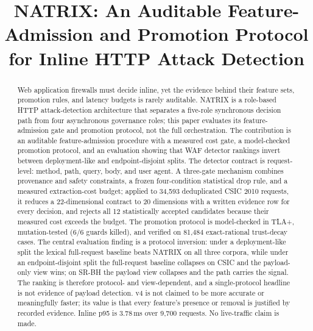 \documentclass[conference]{IEEEtran}
\begin{document}
\title{NATRIX: An Auditable Feature-Admission and Promotion Protocol for Inline HTTP Attack Detection}

\author{
\and
{}
}

\maketitle

\begin{abstract}
Web application firewalls must decide inline, yet the evidence behind their feature sets, promotion rules, and latency budgets is rarely auditable. NATRIX is a role-based HTTP attack-detection architecture that separates a five-role synchronous decision path from four asynchronous governance roles; this paper evaluates its feature-admission gate and promotion protocol, not the full orchestration. The contribution is an auditable feature-admission procedure with a measured cost gate, a model-checked promotion protocol, and an evaluation showing that WAF detector rankings invert between deployment-like and endpoint-disjoint splits. The detector contract is request-level: method, path, query, body, and user agent. A three-gate mechanism combines provenance and safety constraints, a frozen four-condition statistical drop rule, and a measured extraction-cost budget; applied to 34,593 deduplicated CSIC 2010 requests, it reduces a 22-dimensional contract to 20 dimensions with a written evidence row for every decision, and rejects all 12 statistically accepted candidates because their measured cost exceeds the budget. The promotion protocol is model-checked in TLA+, mutation-tested (6/6 guards killed), and verified on 81,484 exact-rational trust-decay cases. The central evaluation finding is a protocol inversion: under a deployment-like split the lexical full-request baseline beats NATRIX on all three corpora, while under an endpoint-disjoint split the full-request baseline collapses on CSIC and the payload-only view wins; on SR-BH the payload view collapses and the path carries the signal. The ranking is therefore protocol- and view-dependent, and a single-protocol headline is not evidence of payload detection. v4 is not claimed to be more accurate or meaningfully faster; its value is that every feature's presence or removal is justified by recorded evidence. Inline p95 is 3.78\,ms over 9,700 requests. No live-traffic claim is made.
\end{abstract}
\end{document}
